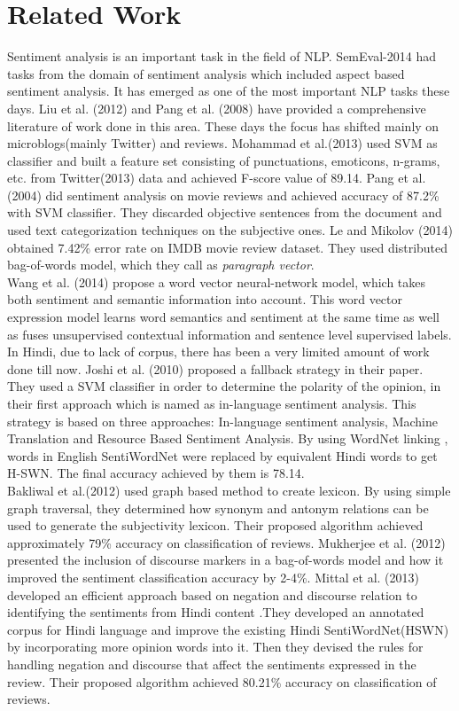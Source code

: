 \def\DevnagVersion{2.15}\documentclass[11pt]{article}
\begin{document}
\section{Related Work}
\label{sec:related}
Sentiment analysis is an important task in the field of NLP. SemEval-2014 had tasks from the domain of sentiment analysis which included aspect based sentiment analysis. It has emerged as one of the most important NLP tasks these days. Liu et al. (2012) and Pang et al. (2008) have provided a comprehensive literature of work done in this area. These days the focus has shifted mainly on microblogs(mainly Twitter) and reviews. Mohammad et al.(2013) used SVM as classifier and built a feature set consisting of punctuations, emoticons, n-grams, etc. from Twitter(2013) data and achieved F-score value of 89.14. Pang et al. (2004) did sentiment analysis on movie reviews and achieved accuracy of 87.2\% with SVM classifier. They discarded objective sentences from the document and used text categorization techniques on the subjective ones. Le and Mikolov (2014) obtained 7.42\% error rate on IMDB movie review dataset. They used distributed bag-of-words model, which they call as \emph{paragraph vector}.\\
Wang et al. (2014) propose a word vector neural-network model, which takes both sentiment and semantic information into account. This word vector expression model learns word semantics and sentiment at the same time as well as fuses unsupervised contextual information and sentence level supervised labels.\\
In Hindi, due to lack of corpus, there has been a very limited amount of work done till now. Joshi et al. (2010) proposed a fallback strategy in their paper. They used a SVM classifier in order to determine the polarity of the opinion, in their first approach which is named as in-language sentiment analysis. This strategy is based on three approaches: In-language sentiment analysis, Machine Translation and Resource Based Sentiment Analysis. By using WordNet linking , words in English SentiWordNet were replaced by equivalent Hindi words to get H-SWN. The final accuracy achieved by them is 78.14.\\
Bakliwal et al.(2012) used graph based method to create lexicon. By using simple graph traversal, they determined how synonym and antonym relations can be used to generate the subjectivity lexicon. Their proposed algorithm achieved approximately 79\% accuracy on classification of reviews. Mukherjee et al. (2012) presented the inclusion of discourse markers in a bag-of-words model and how it improved the sentiment classification accuracy by 2-4\%. Mittal et al. (2013) developed an efficient approach based on negation and discourse relation to identifying the sentiments from Hindi content .They developed an annotated corpus for Hindi
language and improve the existing Hindi SentiWordNet(HSWN) by incorporating more opinion words into it. Then they devised the rules for handling negation and discourse that affect the sentiments expressed in the review. Their proposed algorithm achieved  80.21\% accuracy on classification of reviews.\\
\end{document}
